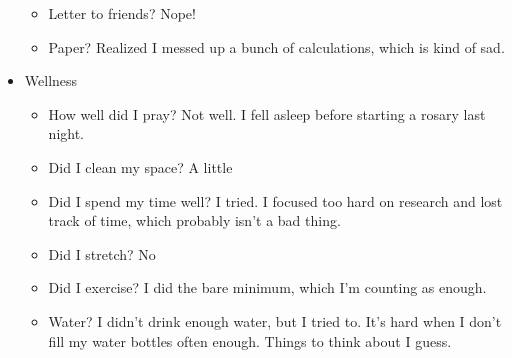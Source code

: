 \documentclass[12pt]{article}[titlepage]
\newcommand{\1}{\={a}}
\newcommand{\2}{\={e}}
\newcommand{\3}{\={\i}}
\newcommand{\4}{\=o}
\newcommand{\5}{\=u}
\newcommand{\6}{\={A}}
\renewcommand{\,}{\textsuperscript{,}}
\begin{document}
\begin{itemize}
\begin{itemize}
\item Letter to friends? Nope!
\item Paper? Realized I messed up a bunch of calculations, which is kind of sad.
\end{itemize}
\item Wellness
\begin{itemize}
\item How well did I pray? Not well. I fell asleep before starting a rosary last night.
\item Did I clean my space? A little
\item Did I spend my time well? I tried. I focused too hard on research and lost track of time, which probably isn't a bad thing.
\item Did I stretch? No
\item Did I exercise? I did the bare minimum, which I'm counting as enough.
\item Water? I didn't drink enough water, but I tried to. It's hard when I don't fill my water bottles often enough. Things to think about I guess.
\end{itemize}
\end{itemize}
\end{document}
